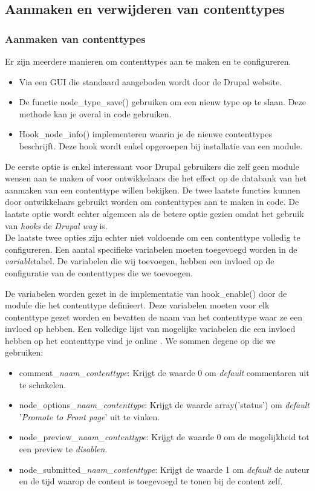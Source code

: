 \subsection{Aanmaken en verwijderen van contenttypes}\label{contenttypeManipulatie}
\subsubsection{Aanmaken van contenttypes}
Er zijn meerdere manieren om contenttypes aan te maken en te configureren.
\begin{itemize}
\item Via een GUI die standaard aangeboden wordt door de Drupal website.
\item De functie node\_type\_save() gebruiken om een nieuw type op te slaan. Deze methode kan je overal in code gebruiken.
\item Hook\_node\_info() implementeren waarin je de nieuwe contenttypes beschrijft. Deze hook wordt enkel opgeroepen bij installatie van een module.
\end{itemize}
\noindent
De eerste optie is enkel interessant voor Drupal gebruikers die zelf geen module wensen aan te maken of voor ontwikkelaars die het effect op de databank van het aanmaken van een contenttype willen bekijken. De twee laatste functies kunnen door ontwikkelaars gebruikt worden om contenttypes aan te maken in code. De laatste optie wordt echter algemeen als de betere optie gezien omdat het gebruik van \textit{hooks} de \textit{Drupal way} is.\\
De laatste twee opties zijn echter niet voldoende om een contenttype volledig te configureren. Een aantal specifieke variabelen moeten toegevoegd worden in de \textit{variable}tabel. De variabelen die wij toevoegen, hebben een invloed op de configuratie van de contenttypes die we toevoegen.

De variabelen worden gezet in de implementatie van hook\_enable() door de module die het contenttype definieert. Deze variabelen moeten voor elk contenttype gezet worden en bevatten de naam van het contenttype waar ze een invloed op hebben. Een volledige lijst van mogelijke variabelen die een invloed hebben op het contenttype vind je online \cite{contentTypeVariables}. We sommen degene op die we gebruiken:
\begin{itemize}
\item comment\_\textit{naam\_contenttype}: Krijgt de waarde 0 om \textit{default} commentaren uit te schakelen.
\item node\_options\_\textit{naam\_contenttype}: Krijgt de waarde array('status') om \textit{default} '\textit{Promote to Front page}' uit te vinken.
\item node\_preview\_\textit{naam\_contenttype}: Krijgt de waarde 0 om de mogelijkheid tot een preview te \textit{disablen}.
\item node\_submitted\_\textit{naam\_contenttype}: Krijgt de waarde 1 om \textit{default} de auteur en de tijd waarop de content is toegevoegd te tonen bij de content zelf.
\end{itemize}

